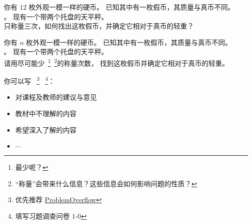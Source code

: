 \documentclass[a4paper, justified]{tufte-handout}
\begin{document}
\begin{solution}
\end{solution}

\begin{problem}[$12$ 枚硬币]
  你有 $12$ 枚外观一模一样的硬币。
  已知其中有一枚假币，其质量与真币不同。\\
  。
  现有一个带两个托盘的天平秤。\\
  只称量三次，如何找出这枚假币，并确定它相对于真币的轻重？

\end{problem}

\begin{solution}%
\end{solution}

\beginoptional
\begin{problem}[\ot{} $n$ 枚硬币]
  你有 $n$ 枚外观一模一样的硬币。
  已知其中有一枚假币，其质量与真币不同。\\
  。
  现有一个带两个托盘的天平秤。\\
  请用尽可能少~\footnote{最少呢？}~\footnote{``称量''会带来什么信息？这些信息会如何影响问题的性质？}的称量次数，
  找到这枚假币并确定它相对于真币的轻重。
\end{problem}

\begin{solution}
\end{solution}
\beginfb

你可以写
~\footnote{优先推荐 \href{http://39.100.120.199}{ProblemOverflow}}
~\footnote{填写习题调查问卷 1-0}：
\begin{itemize}
  \item 对课程及教师的建议与意见
  \item 教材中不理解的内容
  \item 希望深入了解的内容
  \item $\cdots$
\end{itemize}
\end{document}
